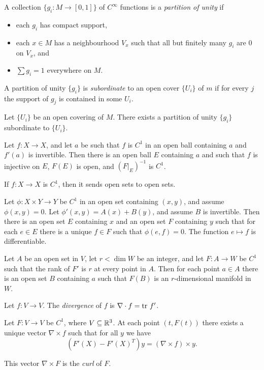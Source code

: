\begin{defn}
    A collection $\{g_i:M\to[0,1]\}$ of $C^\infty$ functions is a \emph{partition of
    unity} if
    \begin{itemize}
        \item each $g_i$ has compact support,
        \item each $x\in M$ has a neighbourhood $V_x$ such that all but finitely
            many $g_i$ are $0$ on $V_x$, and
        \item $\sum g_i=1$ everywhere on $M$.
    \end{itemize}

    A partition of unity $\{g_i\}$ is \emph{subordinate} to an open cover
    $\{U_i\}$ of $m$ if for every $j$ the support of $g_j$ is contained in some
    $U_i$.
\end{defn}
\begin{thm}
    Let $\{U_i\}$ be an open covering of $M$. There exists a partition of unity
    $\{g_i\}$ subordinate to $\{U_i\}$.
\end{thm}
\begin{thm}
    Let $f:X\to X$, and let $a$ be such that $f$ is $C^1$ in an open ball
    containing $a$ and $f'(a)$ is invertible.
    Then there is an open ball $E$ containing $a$ and such that $f$ is injective on
    $E$, $F(E)$ is open, and $(F|_E)^{-1}$ is $C^1$.
\end{thm}
\begin{cor}
    If $f:X\to X$ is $C^1$, then it sends open sets to open sets.
\end{cor}
\begin{thm}
    Let $\phi:X\times Y\to Y$ be $C^1$ in an open set containing $(x,y)$, and
    assume $\phi(x,y)=0$. Let $\phi'(x,y)=A(x)+B(y)$, and assume $B$ is invertible.
    Then there is an open set $E$ containing $x$ and an open set $F$ containing
    $y$ such that for each $e\in E$ there is a unique $f\in F$ such that
    $\phi(e,f)=0$. The function $e\mapsto f$ is differentiable.
\end{thm}
\begin{thm}
    Let $A$ be an open set in $V$, let $r<\dim W$ be an integer, and let
    $F:A\to W$ be $C^1$ such that the rank of $F'$ is $r$ at every point in $A$.
    Then for each point $a\in A$ there is an open set $B$ containing $a$ such
    that $F(B)$ is an $r$-dimensional manifold in $W$.
\end{thm}
\begin{defn}
    Let $f:V\to V$. The \emph{divergence} of $f$ is $\nabla\cdot f=\mathrm{tr}\  f'$.
\end{defn}
\begin{prop}
    Let $F:V\to V$ be $C^1$, where $V\subseteq\mathbb{R}^3$. At each point $(t,F(t))$
    there exists a unique vector $\nabla\times f$ such that for all $y$ we have
    \[(F'(X)-F'(X)^T)y=(\nabla\times f)\times y.\]
\end{prop}
\begin{defn}
    This vector $\nabla\times F$ is the \emph{curl} of $F$.
\end{defn}
